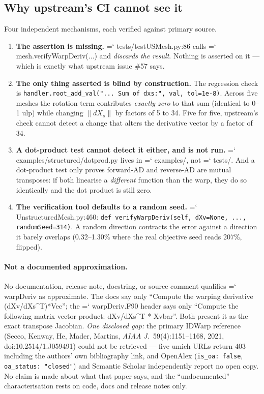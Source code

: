 \documentclass[11pt,a4paper]{article}
\newcommand{\artifact}[1]{{\small\ttfamily\hyphenchar\font=`\-\relax
  \def\_{\textunderscore\allowbreak}#1}}
\begin{document}
\subsection{Why upstream's CI cannot see it}

Four independent mechanisms, each verified against primary source.

\begin{enumerate}
\item \textbf{The assertion is missing.} \artifact{tests/test\_USMesh.py:86} calls
\artifact{mesh.verifyWarpDeriv(...)} and \emph{discards the result}. Nothing is asserted on
it --- which is exactly what upstream issue \#57 says.
\item \textbf{The only thing asserted is blind by construction.} The regression check is
\texttt{handler.root\_add\_val("... Sum of dxs:", val, tol=1e-8)}. Across five meshes the
rotation term contributes \emph{exactly zero} to that sum (identical to 0--1 ulp) while
changing \(\lVert dX_s\rVert\) by factors of 5 to 34. Five for five, upstream's check cannot
detect a change that alters the derivative vector by a factor of 34.
\item \textbf{A dot-product test cannot detect it either, and is not run.}
\artifact{examples/structured/dotprod.py} lives in \artifact{examples/}, not
\artifact{tests/}. And a dot-product test only proves forward-AD and reverse-AD are mutual
transposes: if both linearise a \emph{different} function than the warp, they do so
identically and the dot product is still zero.
\item \textbf{The verification tool defaults to a random seed.}
\artifact{UnstructuredMesh.py:460}: \texttt{def verifyWarpDeriv(self, dXv=None, ...,
randomSeed=314)}. A random direction contracts the error against a direction it barely
overlaps (0.32--1.30\% where the real objective seed reads 207\%, flipped).
\end{enumerate}

\paragraph{Not a documented approximation.} No documentation, release note, docstring, or
source comment qualifies \artifact{warpDeriv} as approximate. The docs say only ``Compute the
warping derivative (dXv/dXs\textasciicircum T)*Vec''; the \artifact{warpDeriv.F90} header says
only ``Compute the following matrix vector product: dXv/dXs\textasciicircum T * Xvbar''. Both
present it as the exact transpose Jacobian. \emph{One disclosed gap:} the primary IDWarp
reference (Secco, Kenway, He, Mader, Martins, \emph{AIAA J.}\ 59(4):1151--1168, 2021,
doi:10.2514/1.J059491) could not be retrieved --- five umich URLs return 403 including the
authors' own bibliography link, and OpenAlex (\texttt{is\_oa: false}, \texttt{oa\_status:
"closed"}) and Semantic Scholar independently report no open copy. No claim is made about
what that paper says, and the ``undocumented'' characterisation rests on code, docs and
release notes only.
\end{document}

